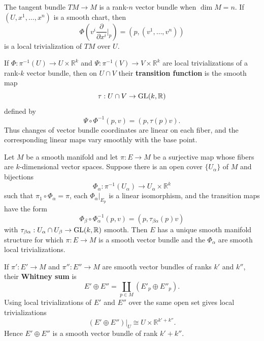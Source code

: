 \documentclass[12pt, oneside]{book}
\begin{document}
\begin{example}
    The tangent bundle $TM\rightarrow M$ is a rank-$n$ vector bundle when $\dim M=n$. If $(U,x^1,\ldots,x^n)$ is a smooth chart, then
    \[
        \Phi\left(v^i\frac{\partial}{\partial x^i}\bigg|_p\right)
        =
        (p,(v^1,\ldots,v^n))
    \]
    is a local trivialization of $TM$ over $U$.
\end{example}

\begin{definition}
    If $\Phi:\pi^{-1}(U)\rightarrow U\times\mathbb{R}^k$ and $\Psi:\pi^{-1}(V)\rightarrow V\times\mathbb{R}^k$ are local trivializations of a rank-$k$ vector bundle, then on $U\cap V$ their \textbf{transition function} is the smooth map
    \[
        \tau:U\cap V\rightarrow \operatorname{\operatorname{GL}}(k,\mathbb{R})
    \]
    defined by
    \[
        \Psi\circ\Phi^{-1}(p,v)=(p,\tau(p)v).
    \]
    Thus changes of vector bundle coordinates are linear on each fiber, and the corresponding linear maps vary smoothly with the base point.
\end{definition}

\begin{lemma}
    Let $M$ be a smooth manifold and let $\pi:E\rightarrow M$ be a surjective map whose fibers are $k$-dimensional vector spaces. Suppose there is an open cover $\{U_\alpha\}$ of $M$ and bijections
    \[
        \Phi_\alpha:\pi^{-1}(U_\alpha)\rightarrow U_\alpha\times\mathbb{R}^k
    \]
    such that $\pi_1\circ\Phi_\alpha=\pi$, each $\Phi_\alpha|_{E_p}$ is a linear isomorphism, and the transition maps have the form
    \[
        \Phi_\beta\circ\Phi_\alpha^{-1}(p,v)=(p,\tau_{\beta\alpha}(p)v)
    \]
    with $\tau_{\beta\alpha}:U_\alpha\cap U_\beta\rightarrow \operatorname{\operatorname{GL}}(k,\mathbb{R})$ smooth. Then $E$ has a unique smooth manifold structure for which $\pi:E\rightarrow M$ is a smooth vector bundle and the $\Phi_\alpha$ are smooth local trivializations.
\end{lemma}

\begin{example}
    If $\pi':E'\rightarrow M$ and $\pi'':E''\rightarrow M$ are smooth vector bundles of ranks $k'$ and $k''$, their \textbf{Whitney sum} is
    \[
        E'\oplus E''
        =
        \coprod_{p\in M}\left(E'_p\oplus E''_p\right).
    \]
    Using local trivializations of $E'$ and $E''$ over the same open set gives local trivializations
    \[
        (E'\oplus E'')|_U\cong U\times\mathbb{R}^{k'+k''}.
    \]
    Hence $E'\oplus E''$ is a smooth vector bundle of rank $k'+k''$.
\end{example}
\end{document}
